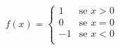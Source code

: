 $$
    f(x) = 
    \begin{cases}
        1  &\text{se } x > 0 \\
        0  &\text{se } x = 0 \\
        -1 &\text{se } x < 0 \\
    \end{cases}
$$